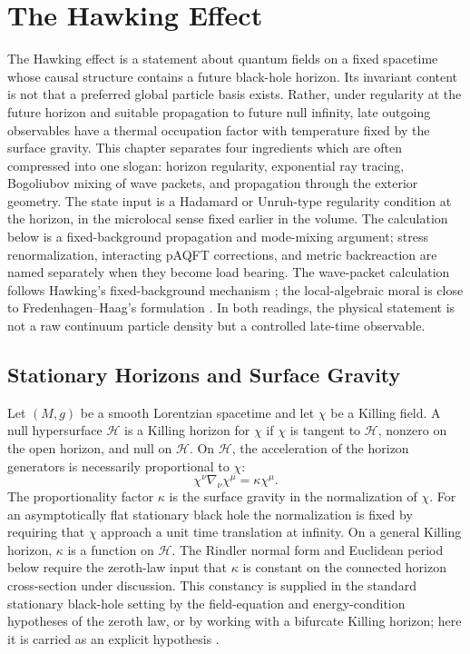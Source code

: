 \chapter{The Hawking Effect}
\label{ch:curved-hawking-effect}

\ConventionsLorentzian

The Hawking effect is a statement about quantum fields on a fixed spacetime
whose causal structure contains a future black-hole horizon.  Its invariant
content is not that a preferred global particle basis exists.  Rather, under
regularity at the future horizon and suitable propagation to future null
infinity, late outgoing observables have a thermal occupation factor with
temperature fixed by the surface gravity.  This chapter separates four
ingredients which are often compressed into one slogan: horizon regularity,
exponential ray tracing, Bogoliubov mixing of wave packets, and propagation
through the exterior geometry.
The state input is a Hadamard or Unruh-type regularity condition at the
horizon, in the microlocal sense fixed earlier in the volume.  The calculation
below is a fixed-background propagation and mode-mixing argument; stress
renormalization, interacting pAQFT corrections, and metric backreaction are
named separately when they become load bearing.
The wave-packet calculation follows Hawking's fixed-background mechanism
\cite{Hawking1975ParticleCreation}; the local-algebraic moral is close to
Fredenhagen--Haag's formulation
\cite{FredenhagenHaag1990HawkingRadiation}.  In both readings, the physical
statement is not a raw continuum particle density but a controlled late-time
observable.

\section{Stationary Horizons and Surface Gravity}

Let \((M,g)\) be a smooth Lorentzian spacetime and let \(\chi\) be a Killing
field.  A null hypersurface \(\mathcal H\) is a Killing horizon for \(\chi\)
if \(\chi\) is tangent to \(\mathcal H\), nonzero on the open horizon, and
null on \(\mathcal H\).  On \(\mathcal H\), the acceleration of the horizon
generators is necessarily proportional to \(\chi\):
\begin{equation}
  \chi^\nu\nabla_\nu\chi^\mu=\kappa\chi^\mu .
  \label{eq:hawking-surface-gravity-definition}
\end{equation}
The proportionality factor \(\kappa\) is the surface gravity in the
normalization of \(\chi\).  For an asymptotically flat stationary black hole
the normalization is fixed by requiring that \(\chi\) approach a unit time
translation at infinity.
On a general Killing horizon, \(\kappa\) is a function on
\(\mathcal H\).  The Rindler normal form and Euclidean period below require
the zeroth-law input that \(\kappa\) is constant on the connected horizon
cross-section under discussion.  This constancy is supplied in the standard
stationary black-hole setting by the field-equation and energy-condition
hypotheses of the zeroth law, or by working with a bifurcate Killing horizon;
here it is carried as an explicit hypothesis
\cite{BardeenCarterHawking1973FourLaws,KayWald1991}.

